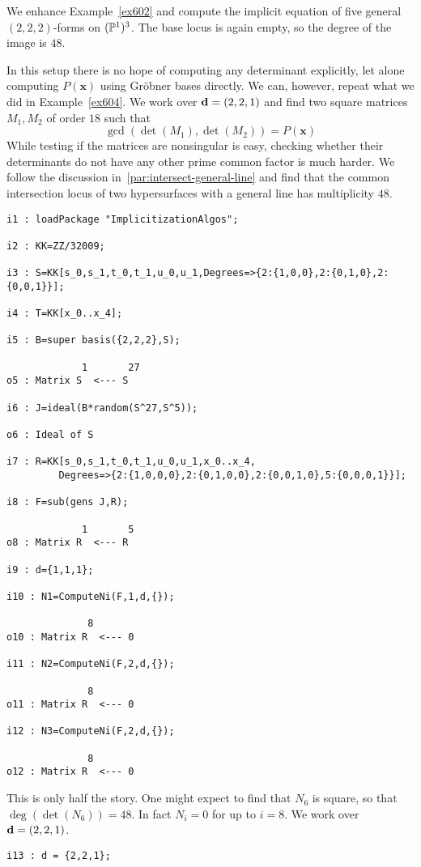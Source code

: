 \documentclass[fleqn,reqno]{amsart}
\begin{document}
\begin{example}[$\mt{ex603}$]
\label{ex603}
We enhance Example~\ref{ex602} and compute the implicit equation of five general
$(2,2,2)$-forms on $(\mathbb{P}^1)^3$.
The base locus is again empty, so the degree of the image is $48$.

In this setup there is no hope of computing any determinant explicitly,
let alone computing $P(\mathbf x)$ using Gr\"obner bases directly.
We can, however, repeat what we did in Example~\ref{ex604}.
We work over $\mathbf d=(2,2,1)$ and find two square matrices $M_1,M_2$ of order $18$
such that
\[
	\gcd(\det(M_1),\det(M_2))=P(\mathbf x)
\]
While testing if the matrices are nonsingular is easy,
checking whether their determinants do not have any other prime common factor
is much harder.
We follow the discussion in~\eqref{par:intersect-general-line} and find
that the common intersection locus of two hypersurfaces with a general line
has multiplicity $48$.
\begin{verbatim}
i1 : loadPackage "ImplicitizationAlgos";

i2 : KK=ZZ/32009;

i3 : S=KK[s_0,s_1,t_0,t_1,u_0,u_1,Degrees=>{2:{1,0,0},2:{0,1,0},2:{0,0,1}}];

i4 : T=KK[x_0..x_4];

i5 : B=super basis({2,2,2},S);

             1       27
o5 : Matrix S  <--- S

i6 : J=ideal(B*random(S^27,S^5));

o6 : Ideal of S

i7 : R=KK[s_0,s_1,t_0,t_1,u_0,u_1,x_0..x_4,
         Degrees=>{2:{1,0,0,0},2:{0,1,0,0},2:{0,0,1,0},5:{0,0,0,1}}];

i8 : F=sub(gens J,R);

             1       5
o8 : Matrix R  <--- R

i9 : d={1,1,1};

i10 : N1=ComputeNi(F,1,d,{});

              8
o10 : Matrix R  <--- 0

i11 : N2=ComputeNi(F,2,d,{});

              8
o11 : Matrix R  <--- 0

i12 : N3=ComputeNi(F,2,d,{});

              8
o12 : Matrix R  <--- 0
\end{verbatim}
This is only half the story.
One might expect to find that $N_6$ is square, so that $\deg(\det(N_6))=48$.
In fact $N_i=0$ for up to $i=8$.
We work over $\mathbf d=(2,2,1)$.
\begin{verbatim}
i13 : d = {2,2,1};


\end{verbatim}
\end{example}
\end{document}
